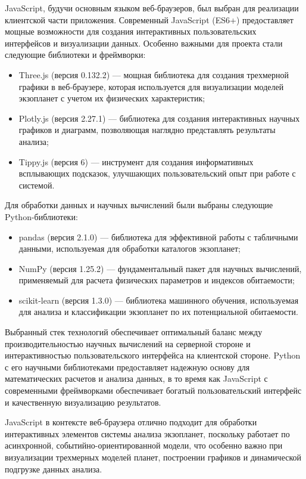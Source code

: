 JavaScript, будучи основным языком веб-браузеров, был выбран для реализации клиентской части приложения. Современный JavaScript (ES6+) предоставляет мощные возможности для создания интерактивных пользовательских интерфейсов и визуализации данных. Особенно важными для проекта стали следующие библиотеки и фреймворки:

\begin{itemize}
    \item Three.js (версия 0.132.2) — мощная библиотека для создания трехмерной графики в веб-браузере, которая используется для визуализации моделей экзопланет с учетом их физических характеристик;
    \item Plotly.js (версия 2.27.1) — библиотека для создания интерактивных научных графиков и диаграмм, позволяющая наглядно представлять результаты анализа;
    \item Tippy.js (версия 6) — инструмент для создания информативных всплывающих подсказок, улучшающих пользовательский опыт при работе с системой.
\end{itemize}

Для обработки данных и научных вычислений были выбраны следующие Python-библиотеки:

\begin{itemize}
    \item pandas (версия 2.1.0) — библиотека для эффективной работы с табличными данными, используемая для обработки каталогов экзопланет;
    \item NumPy (версия 1.25.2) — фундаментальный пакет для научных вычислений, применяемый для расчета физических параметров и индексов обитаемости;
    \item scikit-learn (версия 1.3.0) — библиотека машинного обучения, используемая для анализа и классификации экзопланет по их потенциальной обитаемости.
\end{itemize}

Выбранный стек технологий обеспечивает оптимальный баланс между производительностью научных вычислений на серверной стороне и интерактивностью пользовательского интерфейса на клиентской стороне. Python с его научными библиотеками предоставляет надежную основу для математических расчетов и анализа данных, в то время как JavaScript с современными фреймворками обеспечивает богатый пользовательский интерфейс и качественную визуализацию результатов.

JavaScript в контексте веб-браузера отлично подходит для обработки интерактивных элементов системы анализа экзопланет, поскольку работает по асинхронной, событийно-ориентированной модели, что особенно важно при визуализации трехмерных моделей планет, построении графиков и динамической подгрузке данных анализа.

